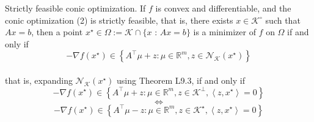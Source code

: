 \begin{theorem}[L9.4]{Strictly feasible conic optimization.}
    If $f$ is convex and differentiable, and the conic optimization (2) is strictly feasible, that is, there exists $x \in \mathcal{K}^{\circ}$ such that $A x=b$, then a point $x^{\star} \in \Omega:=\mathcal{K} \cap\{x$ : $A x=b\}$ is a minimizer of $f$ on $\Omega$ if and only if
    \vspace{-4pt}\\
    $$
    -\nabla f\left(x^{\star}\right) \in\left\{A^{\top} \mu+z: \mu \in \mathbb{R}^m, z \in \mathcal{N}_{\mathcal{K}}\left(x^{\star}\right)\right\}
    $$
    \vspace{-4pt}\\
    that is, expanding $\mathcal{N}_{\mathcal{K}}\left(x^{\star}\right)$ using Theorem L9.3, if and only if
    \vspace{-4pt}\\
    $$
    -\nabla f\left(x^{\star}\right) \in\left\{A^{\top} \mu+z: \mu \in \mathbb{R}^m, z \in \mathcal{K}^{\perp},\left\langle z, x^{\star}\right\rangle=0\right\}
    $$
    \vspace{-8pt}
    $$
    \Leftrightarrow
    $$
    \vspace{-8pt}
    $$
    -\nabla f\left(x^{\star}\right) \in\left\{A^{\top} \mu-z: \mu \in \mathbb{R}^m, z \in \mathcal{K}^{\star},\left\langle z, x^{\star}\right\rangle=0\right\}
    $$
    \vspace{-4pt}
\end{theorem}

